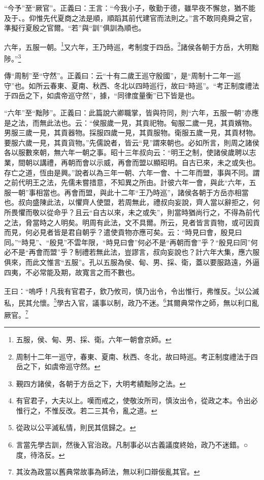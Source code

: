 {\noindent\shu{}\fzkt “今予”至“厥官”。正義曰：王言：“今我小子，敬勤于德，雖早夜不懈怠，猶不能及于、。仰惟先代夏商之法是順，順蹈其前代建官而法則之。”言不敢同堯舜之官，準擬行夏殷之官爾。“若”與“訓”俱訓為順也。 \par}

六年，五服一朝。\footnote{五服，侯、甸、男、採、衛。六年一朝會京師。}又六年，王乃時巡，考制度于四岳。\footnote{周制十二年一巡守，春東、夏南、秋西、冬北，故曰時巡。考正制度禮法于四岳之下，如虞帝巡守然。}諸侯各朝于方岳，大明黜陟。”\footnote{覲四方諸侯，各朝于方岳之下，大明考績黜陟之法。}


{\noindent\zhuan{}\fzbyks 傳“周制”至“守然”。正義曰：云“十有二歲王巡守殷國”，是“周制十二年一巡守”也。如所云春東、夏南、秋西、冬北以四時巡行，故曰“時巡”。“考正制度禮法于四岳之下，如虞帝巡守然”，據，“同律度量衡”已下皆是也。 \par}

{\noindent\shu{}\fzkt “六年”至“黜陟”。正義曰：此篇說六卿職掌，皆與符同，則“六年，五服一朝”亦應是之法，而無此法也。云：“侯服歲一見，其貢祀物。甸服二歲一見，其貢嬪物。男服三歲一見，其貢器物。採服四歲一見，其貢服物。衛服五歲一見，其貢材物。要服六歲一見，其貢貨物。”先儒說者，皆云“見”謂來朝也。必如所言，則周之諸侯各以服數來朝，無六年一朝之事。昭十三年叔向云：“明王之制，使諸侯歲聘以志業，間朝以講禮，再朝而會以示威，再會而盟以顯昭明。自古已來，未之或失也。存亡之道，恆由是興。”說者以為三年一朝、六年一會、十二年而盟，事與不同。謂之前代明王之法，先儒未嘗措意，不知異之所由。計彼六年一會，與此“六年，五服一朝”事相當也。再會而盟，與此十二年“王乃時巡”，諸侯各朝于方岳亦相當也。叔向盛陳此法，以懼齊人使盟，若周無此，禮叔向妄說，齊人當以辭拒之，何所畏懼而敬以從命乎？且云“自古以來，未之或失”，則當時猶尚行之，不得為前代之法，脅當時之人明矣。明周有此法，文不具爾。所云，見者皆言貢物，或可因貢而見，何必見者皆是君自朝乎？遣使貢物亦應可矣。云：“時見曰會，殷見曰同。”“時見”、“殷見”不雲年限，“時見曰會”何必不是“再朝而會”乎？“殷見曰同”何必不是“再會而盟”乎？制禮若無此法，豈謬言，叔向妄說也？計六年大集，應六服俱來，而此文惟言“五服”。孔以五服為侯、甸、男、採、衛，蓋以要服路遠，外逼四夷，不必常能及期，故寬言之而不數也。 \par}

王曰：“嗚呼！凡我有官君子，欽乃攸司，慎乃出令，令出惟行，弗惟反。\footnote{有官君子，大夫以上。嘆而戒之，使敬汝所司，慎汝出令，從政之本。令出必惟行之，不惟反改。若二三其令，亂之道。}以公滅私，民其允懷。\footnote{從政以公平滅私情，則民其信歸之。}學古入官，議事以制，政乃不迷。\footnote{言當先學古訓，然後入官治政。凡制事必以古義議度終始，政乃不迷錯。○度，待洛反。}其爾典常作之師，無以利口亂厥官。\footnote{其汝為政當以舊典常故事為師法，無以利口辯佞亂其官。}


